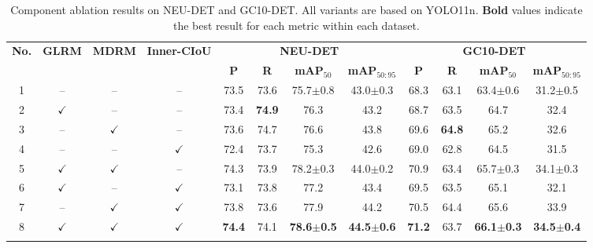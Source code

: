 \documentclass[pdflatex,sn-nature]{sn-jnl}
\begin{document}
\begin{table}[!t]
    \centering
    \caption{Component ablation results on NEU-DET and GC10-DET.
    All variants are based on YOLO11n.
    \textbf{Bold} values indicate the best result for each metric within each dataset.}
    \label{tab:component_ablation}

    \fontsize{6.0pt}{7.5pt}\selectfont
    \setlength{\tabcolsep}{0.4pt}
    \renewcommand{\arraystretch}{1.08}

    \begin{tabular*}{\textwidth}
    {@{\extracolsep{\fill}}cccc*{8}{c}@{}}
    \toprule

    \multirow{2}{*}{\textbf{No.}} &
    \multirow{2}{*}{\textbf{GLRM}} &
    \multirow{2}{*}{\textbf{MDRM}} &
    \multirow{2}{*}{\textbf{Inner-CIoU}} &
    \multicolumn{4}{c}{\textbf{NEU-DET}} &
    \multicolumn{4}{c}{\textbf{GC10-DET}} \\

    \cmidrule(lr){5-8}
    \cmidrule(lr){9-12}

    & & & &
    \textbf{P} &
    \textbf{R} &
    \textbf{mAP$_{50}$} &
    \textbf{mAP$_{50:95}$} &
    \textbf{P} &
    \textbf{R} &
    \textbf{mAP$_{50}$} &
    \textbf{mAP$_{50:95}$} \\

    \midrule

    1 & -- & -- & -- &
    73.5 & 73.6 & 75.7\(\pm\)0.8 & 43.0\(\pm\)0.3 &
    68.3 & 63.1 & 63.4\(\pm\)0.6 & 31.2\(\pm\)0.5\\

    2 & $\checkmark$ & -- & -- &
    73.4 & \textbf{74.9} & 76.3 & 43.2 &
    68.7 & 63.5 & 64.7 & 32.4 \\

    3 & -- & $\checkmark$ & -- &
    73.6 & 74.7 & 76.6 & 43.8 &
    69.6 & \textbf{64.8} & 65.2 & 32.6 \\

    4 & -- & -- & $\checkmark$ &
    72.4 & 73.7 & 75.3 & 42.6 &
    69.0 & 62.8 & 64.5 & 31.5 \\

    5 & $\checkmark$ & $\checkmark$ & -- &
    74.3 & 73.9 & 78.2\(\pm\)0.3 & 44.0\(\pm\)0.2 &
    70.9 & 63.4 & 65.7\(\pm\)0.3 & 34.1\(\pm\)0.3 \\

    6 & $\checkmark$ & -- & $\checkmark$ &
    73.1 & 73.8 & 77.2 & 43.4 &
    69.5 & 63.5 & 65.1 & 32.1 \\

    7 & -- & $\checkmark$ & $\checkmark$ &
    73.8 & 73.6 & 77.9 & 44.2 &
    70.5 & 64.4 & 65.6 & 33.9 \\

    \midrule

    8 & $\checkmark$ & $\checkmark$ & $\checkmark$ &
    \textbf{74.4} & 74.1 &
    \textbf{78.6\(\pm\)0.5} & \textbf{44.5\(\pm\)0.6} &
    \textbf{71.2} & 63.7 &
    \textbf{66.1\(\pm\)0.3} & \textbf{34.5\(\pm\)0.4} \\

    \botrule
    \end{tabular*}
\end{table}
\end{document}

